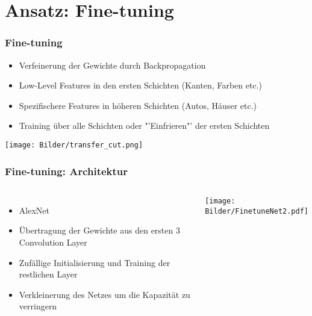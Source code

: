\documentclass[t]{beamer}
\begin{document}
\section{Ansatz: Fine-tuning}
\begin{frame}
 \frametitle{Fine-tuning}
  \begin{itemize}
	\item Verfeinerung der Gewichte durch Backpropagation
	\item Low-Level Features in den ersten Schichten (Kanten, Farben etc.)
	\item Spezifischere Features in höheren Schichten (Autos, Häuser etc.)
	\item Training über alle Schichten oder "'Einfrieren"' der ersten Schichten
  \end{itemize}
  \bigskip
  \hspace{3mm}
  \texttt{[image: Bilder/transfer\_cut.png]}
\end{frame}


\begin{frame}
  \frametitle{Fine-tuning: Architektur}
  \begin{columns}[T]
    \column{55mm}
    \bigskip
    \begin{itemize}%
    \item AlexNet
   \item Übertragung der Gewichte aus den ersten 3 Convolution Layer
    \item Zufällige Initialisierung und Training der restlichen Layer
    \item Verkleinerung des Netzes um die Kapazität zu verringern
    \end{itemize}
    \column{50mm}
    \hspace*{-5mm}%
	\texttt{[image: Bilder/FinetuneNet2.pdf]}
  \end{columns}
\end{frame}
\end{document}
